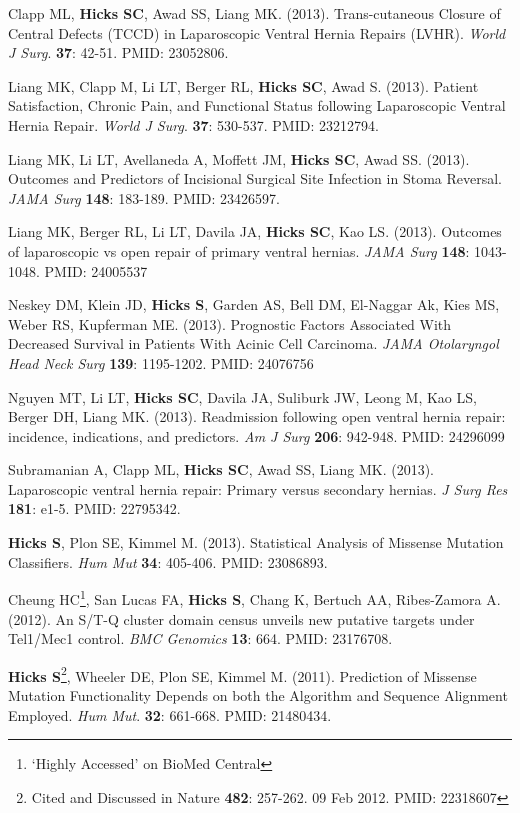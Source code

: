 \documentclass[10pt]{article}
\begin{document}
\begin{enumerate}[label= {[\arabic*]}]
\item Clapp ML, \textbf{Hicks SC}, Awad SS, Liang MK. (2013). Trans-cutaneous Closure of Central Defects (TCCD) in Laparoscopic Ventral Hernia Repairs (LVHR). {\it World J Surg}. {\bf 37}: 42-51. PMID: 23052806.
\item Liang MK, Clapp M, Li LT, Berger RL, {\bf Hicks SC}, Awad S. (2013). Patient Satisfaction, Chronic Pain, and Functional Status following Laparoscopic Ventral Hernia Repair. {\it World J Surg}. {\bf 37}: 530-537. PMID: 23212794. 
\item Liang MK, Li LT, Avellaneda A, Moffett JM, {\bf Hicks SC}, Awad SS. (2013). Outcomes and Predictors of Incisional Surgical Site Infection in Stoma Reversal. {\it JAMA Surg} {\bf 148}: 183-189. PMID: 23426597. 
\item Liang MK, Berger RL, Li LT, Davila JA, {\bf Hicks SC}, Kao LS. (2013). Outcomes of laparoscopic vs open repair of primary ventral hernias. {\it JAMA Surg} {\bf 148}: 1043-1048. PMID: 24005537 
\item Neskey DM, Klein JD, {\bf Hicks S}, Garden AS, Bell DM, El-Naggar Ak, Kies MS, Weber RS, Kupferman ME. (2013). Prognostic Factors Associated With Decreased Survival in Patients With Acinic Cell Carcinoma. {\it JAMA Otolaryngol Head Neck Surg} {\bf 139}: 1195-1202. PMID: 24076756
\item Nguyen MT, Li LT, {\bf Hicks SC}, Davila JA, Suliburk JW, Leong M, Kao LS, Berger DH, Liang MK. (2013). Readmission following open ventral hernia repair: incidence, indications, and predictors. {\it Am J Surg} {\bf 206}: 942-948. PMID: 24296099
\item Subramanian A, Clapp ML, {\bf Hicks SC}, Awad SS, Liang MK. (2013). Laparoscopic ventral hernia repair: Primary versus secondary hernias. {\it J Surg Res} {\bf 181}: e1-5. PMID: 22795342.
\item \textbf{Hicks S}, Plon SE, Kimmel M. (2013). Statistical Analysis of Missense Mutation Classifiers. {\it Hum Mut} {\bf 34}: 405-406. PMID: 23086893. 
\item Cheung HC\footnote{ `Highly Accessed' on BioMed Central}, San Lucas FA, \textbf{Hicks S}, Chang K, Bertuch AA, Ribes-Zamora A. (2012). An S/T-Q cluster domain census unveils new putative targets under Tel1/Mec1 control. {\it BMC Genomics} {\bf 13}: 664. PMID: 23176708. 
\item \textbf{Hicks S}\footnote{Cited and Discussed in Nature {\bf 482}: 257-262. 09 Feb 2012. PMID: 22318607}, Wheeler DE, Plon SE, Kimmel M. (2011). Prediction of Missense Mutation Functionality Depends on both the Algorithm and Sequence Alignment Employed. {\it Hum Mut}. {\bf 32}: 661-668. PMID: 21480434.
\end{enumerate}
\end{document}
